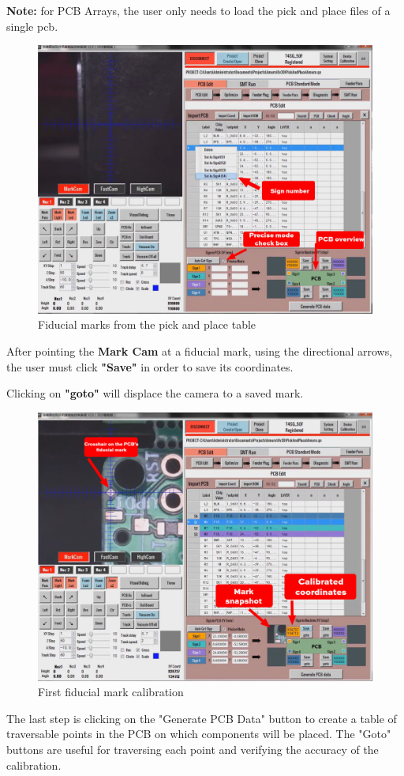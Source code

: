 \documentclass[a4paper,10pt]{report}
\begin{document}
\textbf{Note:} for PCB Arrays, the user only needs to load the pick and place files of a single pcb.
\begin{figure}[!htb]
 \centering
 \includegraphics[width=1\textwidth]{images/scrot5.png}
 \caption{Fiducial marks from the pick and place table}
\end{figure}

\newpage
After pointing the \textbf{Mark Cam} at a fiducial mark, using the directional arrows, the user must click \textbf{"Save"} in order to save its coordinates.

Clicking on \textbf{"goto"} will displace the camera to a saved mark.\\
\begin{figure}[!htb]
 \centering
 \includegraphics[width=1\textwidth]{images/scrot6.png}
 \caption{First fiducial mark calibration}
\end{figure}
\newpage
The last step is clicking on the "Generate PCB Data" button to create a table of traversable points in the PCB on which components will be placed. The "Goto" buttons are useful for traversing each point and verifying the accuracy of the calibration.\\
\end{document}
